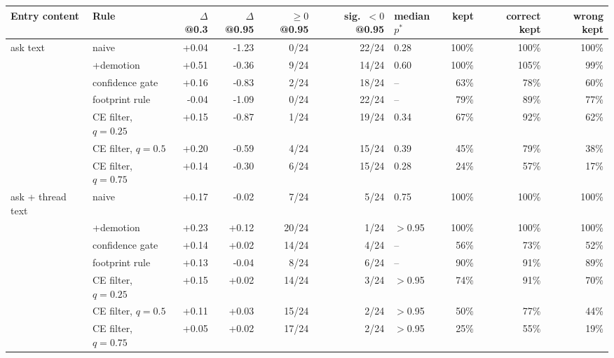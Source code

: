 \begin{tabular}{llrrrrlrrr}\toprule Entry content & Rule & $\Delta$@0.3 & $\Delta$@0.95 & $\ge0$@0.95 & sig.\ $<0$@0.95 & median $p^*$ & kept & correct kept & wrong kept\\\midrule
ask text & naive & +0.04 & -1.23 & 0/24 & 22/24 & 0.28 & 100\% & 100\% & 100\%\\
 & +demotion & +0.51 & -0.36 & 9/24 & 14/24 & 0.60 & 100\% & 105\% & 99\%\\
 & confidence gate & +0.16 & -0.83 & 2/24 & 18/24 & -- & 63\% & 78\% & 60\%\\
 & footprint rule & -0.04 & -1.09 & 0/24 & 22/24 & -- & 79\% & 89\% & 77\%\\
 & CE filter, $q=0.25$ & +0.15 & -0.87 & 1/24 & 19/24 & 0.34 & 67\% & 92\% & 62\%\\
 & CE filter, $q=0.5$ & +0.20 & -0.59 & 4/24 & 15/24 & 0.39 & 45\% & 79\% & 38\%\\
 & CE filter, $q=0.75$ & +0.14 & -0.30 & 6/24 & 15/24 & 0.28 & 24\% & 57\% & 17\%\\
\addlinespace[2pt]
ask + thread text & naive & +0.17 & -0.02 & 7/24 & 5/24 & 0.75 & 100\% & 100\% & 100\%\\
 & +demotion & +0.23 & +0.12 & 20/24 & 1/24 & $>$0.95 & 100\% & 100\% & 100\%\\
 & confidence gate & +0.14 & +0.02 & 14/24 & 4/24 & -- & 56\% & 73\% & 52\%\\
 & footprint rule & +0.13 & -0.04 & 8/24 & 6/24 & -- & 90\% & 91\% & 89\%\\
 & CE filter, $q=0.25$ & +0.15 & +0.02 & 14/24 & 3/24 & $>$0.95 & 74\% & 91\% & 70\%\\
 & CE filter, $q=0.5$ & +0.11 & +0.03 & 15/24 & 2/24 & $>$0.95 & 50\% & 77\% & 44\%\\
 & CE filter, $q=0.75$ & +0.05 & +0.02 & 17/24 & 2/24 & $>$0.95 & 25\% & 55\% & 19\%\\
\bottomrule\end{tabular}